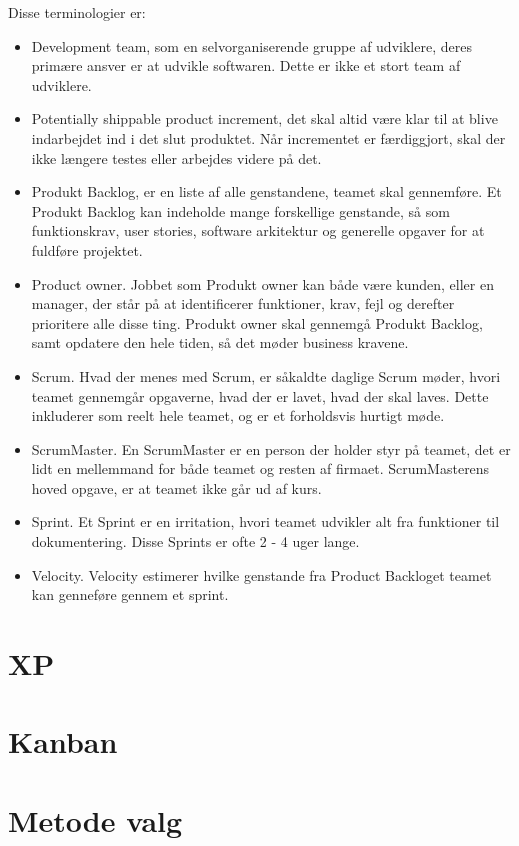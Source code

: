 Disse terminologier er:  
\begin{itemize}
    \item Development team, som en selvorganiserende gruppe af udviklere, deres primære ansver er at udvikle softwaren. Dette er ikke et stort team af udviklere. 
    
    \item Potentially shippable product increment, det skal altid være klar til at blive indarbejdet ind i det slut produktet. Når incrementet er færdiggjort, skal der ikke længere testes eller arbejdes videre på det.
    
    \item Produkt Backlog, er en liste af alle genstandene, teamet skal gennemføre. Et Produkt Backlog kan indeholde mange forskellige genstande, så som funktionskrav, user stories, software arkitektur og generelle opgaver for at fuldføre projektet. 

    
    \item Product owner. Jobbet som Produkt owner kan både være kunden, eller en manager, der står på at identificerer funktioner, krav, fejl og derefter prioritere alle disse ting. Produkt owner skal gennemgå Produkt Backlog, samt opdatere den hele tiden, så det møder business kravene. 
    
    \item Scrum. Hvad der menes med Scrum, er såkaldte daglige Scrum møder, hvori teamet gennemgår opgaverne, hvad der er lavet, hvad der skal laves. Dette inkluderer som reelt hele teamet, og er et forholdsvis hurtigt møde. 
    
    \item ScrumMaster. En ScrumMaster er en person der holder styr på teamet, det er lidt en mellemmand for både teamet og resten af firmaet. ScrumMasterens hoved opgave, er at teamet ikke går ud af kurs. 
    
    \item Sprint. Et Sprint er en irritation, hvori teamet udvikler alt fra funktioner til dokumentering. Disse Sprints er ofte 2 - 4 uger lange. 
    
    \item Velocity. Velocity estimerer hvilke genstande fra Product Backloget teamet kan genneføre gennem et sprint.
\end{itemize}

\section{XP}




\section{Kanban}


\section{Metode valg}


 


